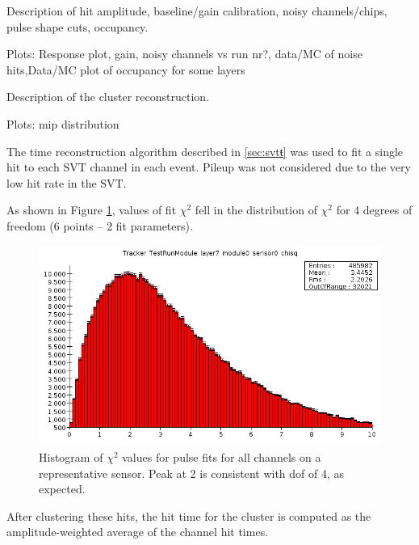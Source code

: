 \vspace{1cm}{\bf Calibration [Omar]}


Description of hit amplitude, baseline/gain calibration, noisy channels/chips, pulse shape cuts, occupancy. 

Plots: Response plot, gain, noisy channels vs run nr?, data/MC of noise hits,Data/MC plot of occupancy for some layers  

\vspace{1cm}{\bf Cluster reconstruction [Omar]}


Description of the cluster reconstruction.

Plots: mip distribution

\vspace{1cm}{\bf SVT timing [Sho]}

The time reconstruction algorithm described in \ref{sec:svtŧ} was used to fit a single hit to each SVT channel in each event.
Pileup was not considered due to the very low hit rate in the SVT.

As shown in Figure \ref{fig:apvfit}, values of fit $\chi^2$ fell in the distribution of $\chi^2$ for 4 degrees of freedom (6 points -- 2 fit parameters).

\begin{figure}[ht]
	\includegraphics[width=\textwidth]{test2012/svtperformance/apvfit_chisq}
	\caption{\small{Histogram of $\chi^2$ values for pulse fits for all channels on a representative sensor. Peak at 2 is consistent with dof of 4, as expected.} }
	\label{fig:apvfit}
\end{figure}

After clustering these hits, the hit time for the cluster is computed as the amplitude-weighted average of the channel hit times. 



